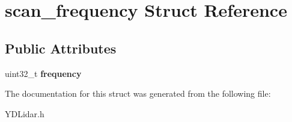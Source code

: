 \hypertarget{structscan__frequency}{}\section{scan\+\_\+frequency Struct Reference}
\label{structscan__frequency}
\subsection*{Public Attributes}
\begin{DoxyCompactItemize}
\item 
uint32\+\_\+t {\bfseries frequency}\hypertarget{structscan__frequency_ae4f2152e77416cff02f44452355f2808}{}\label{structscan__frequency_ae4f2152e77416cff02f44452355f2808}

\end{DoxyCompactItemize}


The documentation for this struct was generated from the following file\+:\begin{DoxyCompactItemize}
\item 
Y\+D\+Lidar.\+h\end{DoxyCompactItemize}
